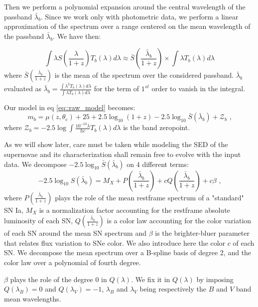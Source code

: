 \documentclass[\docopts]{\docclass}
\begin{document}
Then we perform a polynomial expansion around the central wavelength of the passband $\bar\lambda_b$.
Since we work only with photometric data, we perform a linear approximation of the spectrum over a range centered on the mean wavelength of the passband $\bar\lambda_b$.
We have then:

\begin{equation}
\int \lambda S\left(\frac{\lambda}{1+z}\right) T_b(\lambda) d\lambda \approx \bar{S}(\frac{\bar\lambda_b }{1+z}) \times \int \lambda T_b(\lambda) d\lambda
\end{equation}
where $\bar{S}(\frac{\bar\lambda_b }{1+z})$ is the mean of the spectrum over the considered passband.
$\bar\lambda_b$ evaluated as $\bar\lambda_b = \frac{\int \lambda^2 T_b(\lambda) d\lambda}{\int \lambda T_b(\lambda) d\lambda}$ for the term of $1^{st}$ order to vanish in the integral.

Our model in eq \ref{eq::raw_model} becomes:          
\begin{equation}
  m_b = \mu(z, \theta_\text{c}) + 25 + 2.5\log_{10}(1+z) - 2.5 \log_{10} \bar{S}(\bar\lambda_b ) + \mathcal{Z}_b \text{ ,}
\end{equation}
where $\mathcal{Z}_b = -2.5 \log \int \frac{10^{-10}\lambda}{hc} T_b(\lambda) d\lambda$ is the band zeropoint.

As we will show later, care must be taken while modeling the SED of the supernovae and its characterization shall remain free to evolve with the input data.
We decompose $-2.5\log_{10}\bar{S}(\bar\lambda_b)$ on 4 different terms:
\begin{equation}
-2.5\log_{10}S(\bar\lambda_b) = M_X + P(\frac{\bar\lambda_b}{1+z}) + cQ(\frac{\bar\lambda_b}{1+z}) + c\beta \text{ ,}
\end{equation}
where $P(\frac{\bar\lambda_b}{1+z})$ plays the role of the mean restframe spectrum of a "standard" SN Ia, $M_X$ is a normalization factor accounting for the restframe absolute luminosity of each SN, $Q(\frac{\bar\lambda_b}{1+z})$ is a color law accounting for the color variation of each SN around the mean SN spectrum and $\beta$ is the brighter-bluer parameter that relates flux variation to SNe color.
We also introduce here the color $c$ of each SN.
We decompose the mean spectrum over a B-spline basis of degree 2, and the color law over a polynomial of fourth degree.

$\beta$ plays the role of the degree 0 in $Q( \lambda )$. We fix it in $Q( \lambda )$ by imposing $Q(\lambda_B) = 0$ and $Q(\lambda_V) = -1$, $\lambda_B$ and $\lambda_V$ being respectively the $B$ and $V$ band mean wavelengths.
\end{document}
